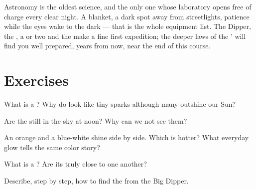 \begin{remark}\label{rem:g5:stars-night-sky:lookup}
Astronomy is the oldest science, and the only one whose laboratory
opens free of charge every clear night. A blanket, a dark spot away
from streetlights, patience while the eyes wake to the dark ---
that is the whole equipment list. The Dipper, the , a
 or two and the  make a fine first expedition; the
deeper laws of the '  will find you well prepared, years
from now, near the end of this course.
\end{remark}

\section{Exercises}

\begin{exercise}[$\star$]\label{exo:g5:stars-night-sky:1}
What is a ? Why do  look like tiny sparks although many
outshine our Sun?
\end{exercise}

\begin{exercise}[$\star$]\label{exo:g5:stars-night-sky:2}
Are the  still in the sky at noon? Why can we not see them?
\end{exercise}

\begin{exercise}[$\star$]\label{exo:g5:stars-night-sky:3}
An orange  and a blue-white  shine side by side. Which is
hotter? What everyday glow tells the same color story?
\end{exercise}

\begin{exercise}[$\star$]\label{exo:g5:stars-night-sky:4}
What is a ? Are its  truly close to one another?
\end{exercise}

\begin{exercise}[$\star$]\label{exo:g5:stars-night-sky:5}
Describe, step by step, how to find the  from the Big
Dipper.
\end{exercise}

